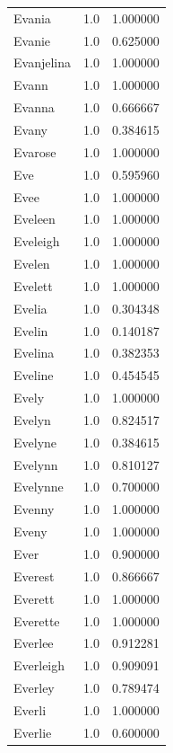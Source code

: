 \documentclass[
  letterpaper,
  DIV=11,
  numbers=noendperiod]{scrreprt}
\begin{document}
\begin{tabular}{lrr}
Evania          &   1.0 &   1.000000 \\
Evanie          &   1.0 &   0.625000 \\
Evanjelina      &   1.0 &   1.000000 \\
Evann           &   1.0 &   1.000000 \\
Evanna          &   1.0 &   0.666667 \\
Evany           &   1.0 &   0.384615 \\
Evarose         &   1.0 &   1.000000 \\
Eve             &   1.0 &   0.595960 \\
Evee            &   1.0 &   1.000000 \\
Eveleen         &   1.0 &   1.000000 \\
Eveleigh        &   1.0 &   1.000000 \\
Evelen          &   1.0 &   1.000000 \\
Evelett         &   1.0 &   1.000000 \\
Evelia          &   1.0 &   0.304348 \\
Evelin          &   1.0 &   0.140187 \\
Evelina         &   1.0 &   0.382353 \\
Eveline         &   1.0 &   0.454545 \\
Evely           &   1.0 &   1.000000 \\
Evelyn          &   1.0 &   0.824517 \\
Evelyne         &   1.0 &   0.384615 \\
Evelynn         &   1.0 &   0.810127 \\
Evelynne        &   1.0 &   0.700000 \\
Evenny          &   1.0 &   1.000000 \\
Eveny           &   1.0 &   1.000000 \\
Ever            &   1.0 &   0.900000 \\
Everest         &   1.0 &   0.866667 \\
Everett         &   1.0 &   1.000000 \\
Everette        &   1.0 &   1.000000 \\
Everlee         &   1.0 &   0.912281 \\
Everleigh       &   1.0 &   0.909091 \\
Everley         &   1.0 &   0.789474 \\
Everli          &   1.0 &   1.000000 \\
Everlie         &   1.0 &   0.600000 \\

\end{tabular}
\end{document}
